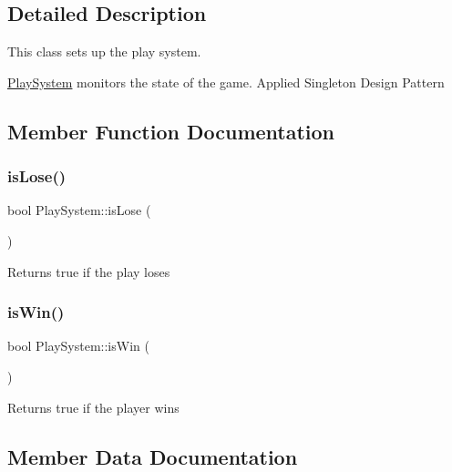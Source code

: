 \subsection{Detailed Description}
This class sets up the play system. 

\mbox{\hyperlink{class_play_system}{Play\+System}} monitors the state of the game. Applied Singleton Design Pattern 

\subsection{Member Function Documentation}
\mbox{\label{class_play_system_a8af443fab3bc9fc40f061addfea4e8b0}} 
\subsubsection{\texorpdfstring{is\+Lose()}{isLose()}}
{\footnotesize\ttfamily bool Play\+System\+::is\+Lose (\begin{DoxyParamCaption}{ }\end{DoxyParamCaption})}

\begin{DoxyReturn}{Returns}
true if the play loses 
\end{DoxyReturn}
\mbox{\label{class_play_system_aa3fb93111ca2ba8eb493f186ae113587}} 
\subsubsection{\texorpdfstring{is\+Win()}{isWin()}}
{\footnotesize\ttfamily bool Play\+System\+::is\+Win (\begin{DoxyParamCaption}{ }\end{DoxyParamCaption})}

\begin{DoxyReturn}{Returns}
true if the player wins 
\end{DoxyReturn}


\subsection{Member Data Documentation}
\mbox{\label{class_play_system_adfb9949639c2a4c96ee28b58fa1eb726}} 
